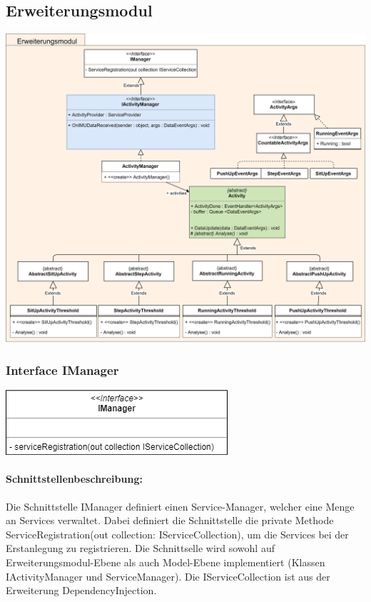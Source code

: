 \documentclass[a4paper,12pt]{article}
\begin{document}
\subsection{Erweiterungsmodul}
\begin{center}
	\centering
	\includegraphics[width=15cm]{Diagramme/uebersicht/Erweiterungsmodul.png}
\end{center}

\begin{minipage}[b]{0.5\textwidth}
	\subsubsection{Interface IManager}
	
	\end{minipage}
	\begin{minipage}[c]{0.5\textwidth}
	\includegraphics[width=\textwidth]{bilder/IManager.png}
\end{minipage}


	\paragraph{Schnittstellenbeschreibung:}
	Die Schnittstelle IManager definiert einen Service-Manager, welcher eine Menge an Services verwaltet. Dabei definiert die Schnittstelle die private Methode ServiceRegistration(out collection: IServiceCollection), um die Services bei der Erstanlegung zu registrieren. Die Schnittselle wird sowohl auf Erweiterungsmodul-Ebene als auch Model-Ebene implementiert (Klassen IActivityManager und ServiceManager). Die IServiceCollection ist aus der Erweiterung \Gls{DependencyInjection}.
	
\end{document}

